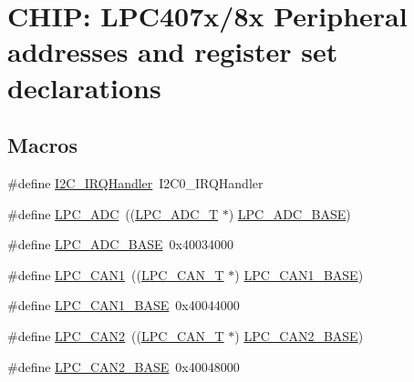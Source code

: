 \hypertarget{group__PERIPH__407X__8X__BASE}{}\section{C\+H\+IP\+: L\+P\+C407x/8x Peripheral addresses and register set declarations}
\label{group__PERIPH__407X__8X__BASE}
\subsection*{Macros}
\begin{DoxyCompactItemize}
\item 
\#define \hyperlink{group__PERIPH__407X__8X__BASE_ga78bc9c1986ea5da20688e1db532c5717}{I2\+C\+\_\+\+I\+R\+Q\+Handler}~I2\+C0\+\_\+\+I\+R\+Q\+Handler
\item 
\#define \hyperlink{group__PERIPH__407X__8X__BASE_gab6eaf639d3a1eec83583a9e11ab7336f}{L\+P\+C\+\_\+\+A\+DC}~((\hyperlink{structLPC__ADC__T}{L\+P\+C\+\_\+\+A\+D\+C\+\_\+T}              $\ast$) \hyperlink{group__PERIPH__407X__8X__BASE_ga2396e0d0c565e4c1c3b2fc593bd6c37f}{L\+P\+C\+\_\+\+A\+D\+C\+\_\+\+B\+A\+SE})
\item 
\#define \hyperlink{group__PERIPH__407X__8X__BASE_ga2396e0d0c565e4c1c3b2fc593bd6c37f}{L\+P\+C\+\_\+\+A\+D\+C\+\_\+\+B\+A\+SE}~0x40034000
\item 
\#define \hyperlink{group__PERIPH__407X__8X__BASE_ga2f006d6888921f8336dce504eb56f4aa}{L\+P\+C\+\_\+\+C\+A\+N1}~((\hyperlink{structLPC__CAN__T}{L\+P\+C\+\_\+\+C\+A\+N\+\_\+T}              $\ast$) \hyperlink{group__PERIPH__407X__8X__BASE_gaf2407c1927ebddd767832aefa74c3398}{L\+P\+C\+\_\+\+C\+A\+N1\+\_\+\+B\+A\+SE})
\item 
\#define \hyperlink{group__PERIPH__407X__8X__BASE_gaf2407c1927ebddd767832aefa74c3398}{L\+P\+C\+\_\+\+C\+A\+N1\+\_\+\+B\+A\+SE}~0x40044000
\item 
\#define \hyperlink{group__PERIPH__407X__8X__BASE_ga838776140ad5e0156715278f8bb0652d}{L\+P\+C\+\_\+\+C\+A\+N2}~((\hyperlink{structLPC__CAN__T}{L\+P\+C\+\_\+\+C\+A\+N\+\_\+T}              $\ast$) \hyperlink{group__PERIPH__407X__8X__BASE_gab9608b3b72dd843a25910dd2a809106b}{L\+P\+C\+\_\+\+C\+A\+N2\+\_\+\+B\+A\+SE})
\item 
\#define \hyperlink{group__PERIPH__407X__8X__BASE_gab9608b3b72dd843a25910dd2a809106b}{L\+P\+C\+\_\+\+C\+A\+N2\+\_\+\+B\+A\+SE}~0x40048000
\item 

\end{DoxyCompactItemize}
